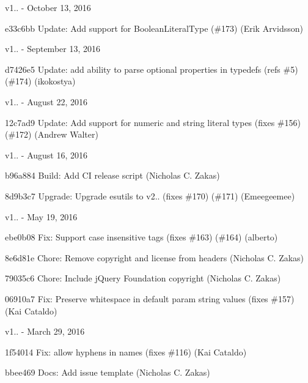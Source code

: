 v1.. -\/ October 13, 2016


\begin{DoxyItemize}
\item e33c6bb Update\+: Add support for Boolean\+Literal\+Type (\#173) (Erik Arvidsson)
\end{DoxyItemize}

v1.. -\/ September 13, 2016


\begin{DoxyItemize}
\item d7426e5 Update\+: add ability to parse optional properties in typedefs (refs \#5) (\#174) (ikokostya)
\end{DoxyItemize}

v1.. -\/ August 22, 2016


\begin{DoxyItemize}
\item 12c7ad9 Update\+: Add support for numeric and string literal types (fixes \#156) (\#172) (Andrew Walter)
\end{DoxyItemize}

v1.. -\/ August 16, 2016


\begin{DoxyItemize}
\item b96a884 Build\+: Add CI release script (Nicholas C. Zakas)
\item 8d9b3c7 Upgrade\+: Upgrade esutils to v2.. (fixes \#170) (\#171) (Emeegeemee)
\end{DoxyItemize}

v1.. -\/ May 19, 2016


\begin{DoxyItemize}
\item ebe0b08 Fix\+: Support case insensitive tags (fixes \#163) (\#164) (alberto)
\item 8e6d81e Chore\+: Remove copyright and license from headers (Nicholas C. Zakas)
\item 79035c6 Chore\+: Include j\+Query Foundation copyright (Nicholas C. Zakas)
\item 06910a7 Fix\+: Preserve whitespace in default param string values (fixes \#157) (Kai Cataldo)
\end{DoxyItemize}

v1.. -\/ March 29, 2016


\begin{DoxyItemize}
\item 1f54014 Fix\+: allow hyphens in names (fixes \#116) (Kai Cataldo)
\item bbee469 Docs\+: Add issue template (Nicholas C. Zakas)
\end{DoxyItemize}

